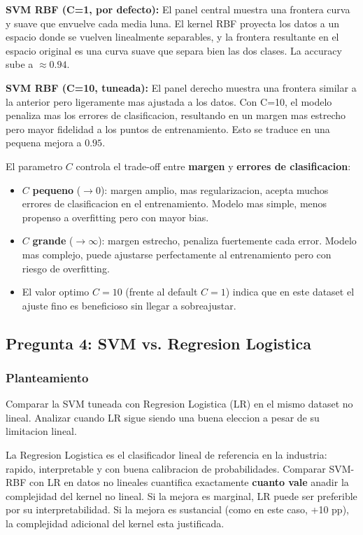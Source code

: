 \documentclass[12pt,a4paper]{article}
\begin{document}
\textbf{SVM RBF (C=1, por defecto):} El panel central muestra una frontera curva y suave que
envuelve cada media luna. El kernel RBF proyecta los datos a un espacio donde se vuelven
linealmente separables, y la frontera resultante en el espacio original es una curva suave que
separa bien las dos clases. La accuracy sube a $\approx 0.94$.

\textbf{SVM RBF (C=10, tuneada):} El panel derecho muestra una frontera similar a la anterior
pero ligeramente mas ajustada a los datos. Con C=10, el modelo penaliza mas los errores de
clasificacion, resultando en un margen mas estrecho pero mayor fidelidad a los puntos de
entrenamiento. Esto se traduce en una pequena mejora a $0.95$.

\begin{tcolorbox}[warnbox]
  El parametro $C$ controla el trade-off entre \textbf{margen} y \textbf{errores de clasificacion}:
  \begin{itemize}
    \item $C$ \textbf{pequeno} ($\to 0$): margen amplio, mas regularizacion, acepta muchos errores de clasificacion en el entrenamiento. Modelo mas simple, menos propenso a overfitting pero con mayor bias.
    \item $C$ \textbf{grande} ($\to \infty$): margen estrecho, penaliza fuertemente cada error. Modelo mas complejo, puede ajustarse perfectamente al entrenamiento pero con riesgo de overfitting.
    \item El valor optimo $C=10$ (frente al default $C=1$) indica que en este dataset el ajuste fino es beneficioso sin llegar a sobreajustar.
  \end{itemize}
\end{tcolorbox}

\subsection{Pregunta 4: SVM vs. Regresion Logistica}

\subsubsection*{Planteamiento}
Comparar la SVM tuneada con Regresion Logistica (LR) en el mismo dataset no lineal. Analizar
cuando LR sigue siendo una buena eleccion a pesar de su limitacion lineal.

\begin{tcolorbox}[porquebox, title={Por que comparar con Regresion Logistica?}]
La Regresion Logistica es el clasificador lineal de referencia en la industria: rapido,
interpretable y con buena calibracion de probabilidades. Comparar SVM-RBF con LR en datos no
lineales cuantifica exactamente \textbf{cuanto vale} anadir la complejidad del kernel no lineal.
Si la mejora es marginal, LR puede ser preferible por su interpretabilidad. Si la mejora es
sustancial (como en este caso, +10 pp), la complejidad adicional del kernel esta justificada.
\end{tcolorbox}
\end{document}
